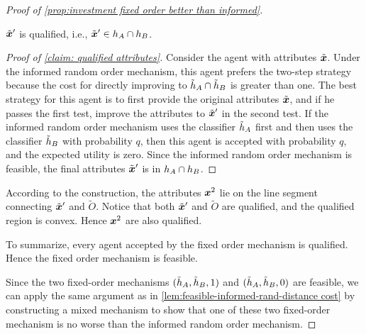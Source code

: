 \begin{proof}[Proof of \cref{prop:investment fixed order better than informed}]
    \begin{claim}\label{claim: qualified attributes}
         $\tilde {\boldsymbol{x}}'$ is qualified, i.e., $\tilde {\boldsymbol{x}}'\in h_A \cap h_B$.
    \end{claim}
    \begin{proof}[Proof of \cref{claim: qualified attributes}]
         Consider the agent with attributes $\tilde {\boldsymbol{x}}$. Under the informed random order mechanism, this agent prefers the two-step strategy because the cost for directly improving to $\tilde {h}_A \cap \tilde {h}_B$ is greater than one. 
    The best strategy for this agent is to first provide the original attributes $\tilde {\boldsymbol{x}}$, and if he passes the first test, improve the attributes to $\tilde{\boldsymbol{x}}'$ in the second test.
    If the informed random order mechanism uses the classifier $\tilde {h}_A$ first and then uses the classifier $\tilde {h}_B$ with probability $q$, then this agent is accepted with probability $q$, and the expected utility is zero. 
    Since the informed random order mechanism is feasible, the final attributes $\tilde {\boldsymbol{x}}'$ is in $h_A \cap h_B$. 
    \end{proof}
   
    
    According to the construction, the attributes $\boldsymbol{x}^2$ lie on the line segment connecting $\tilde {\boldsymbol{x}}'$ and $\tilde O$.
    Notice that both $\tilde {\boldsymbol{x}}'$ and $\tilde O$ are qualified, and the qualified region is convex.
    Hence $\boldsymbol{x}^2$ are also qualified.  
    
     To summarize, every agent accepted by the fixed order mechanism is qualified.
     Hence the fixed order mechanism is  feasible. 

    Since the two fixed-order mechanisms $(\tilde {h}_A,\tilde {h}_B,1)$ and $(\tilde {h}_A,\tilde {h}_B,0)$ are feasible, we can apply the same argument as in \cref{lem:feasible-informed-rand-distance cost} by constructing a mixed mechanism to show that one of these two fixed-order mechanism is no worse than the informed random order mechanism. 
\end{proof}